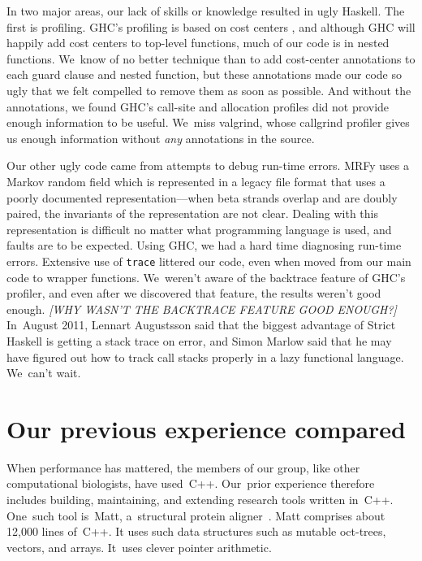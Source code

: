 \documentclass[preprint,nonatbib,blockstyle,nocopyrightspace,times]{sigplanconf}
\newcommand\seclabel[1]{\label{sec:#1}}
\let\cite\citep
\begin{document}
\seclabel{awkward-profiling}

In two major areas, our lack of skills or knowledge resulted in ugly
Haskell.
The first is profiling.
GHC's profiling is based on cost centers \cite{sansom-pj},
and although GHC 
will happily add cost centers to top-level 
functions, much of our code is in nested functions.
We~know of no better technique than to add cost-center annotations to
each guard clause and nested function,
but these annotations made our code so ugly that we felt compelled to
remove them as soon as possible.
And without the annotations, we found GHC's call-site and allocation
profiles did not provide enough information to be useful.
We~miss valgrind, whose callgrind profiler gives us enough information
without \emph{any} annotations in the source.

Our other ugly code came from  attempts to debug
run-time errors.
MRFy uses a Markov random field which is represented in a legacy file
format that uses a poorly documented representation---when beta
strands overlap and are doubly paired, the invariants of the
representation are not clear.
Dealing with this representation is difficult no matter what
programming language is used, and faults are to be expected.
Using GHC, we had a hard time diagnosing run-time errors.
Extensive use of 
\texttt{trace} 
littered our code,
even when moved from our main code to wrapper functions.
We~weren't aware of the backtrace feature of GHC's profiler,
and even after we discovered that feature, the results weren't good enough.
\emph{[WHY WASN'T THE BACKTRACE FEATURE GOOD ENOUGH?]}
In~August 2011, 
Lennart Augustsson said that the biggest advantage of Strict
Haskell is getting a stack trace on error,
and Simon Marlow said that he may have figured out how to track call
stacks properly in a lazy functional language.
We~can't wait.

 
 
\section{Our previous experience compared}

When performance has mattered, the members of our group, like other
computational biologists, have used~C++.
Our~prior experience therefore includes building,
maintaining, and extending research tools written in~C++.
One~such tool is~Matt,
a~structural protein aligner~\cite{Menke:2008wu}.
Matt comprises about 12,000 lines of~C++.
It uses such
data structures such as mutable oct-trees, vectors, and arrays.
It~uses clever pointer arithmetic.
\end{document}
